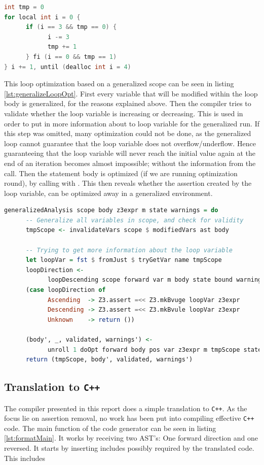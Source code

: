 \begin{lstlisting}[language=C++, label=require-generalize, caption=Loop requirering generalization]
int tmp = 0
for local int i = 0 {
      if (i == 3 && tmp == 0) {
            i -= 3
            tmp += 1
      } fi (i == 0 && tmp == 1)
} i += 1, until (dealloc int i = 4)
\end{lstlisting}
\noindent
This loop optimization based on a generalized scope can be seen in listing
\ref{lst:generalizeLoopOpt}.
First every variable that will be modified within the loop body is generalized, for the
reasons explained above. Then the compiler tries to validate whether the loop variable is
increasing or decreasing. This is used in order to put in more information about to loop
variable for the generalized run. If this step was omitted, many optimization could not be
done, as the generalized loop cannot guarantee that the loop variable does not overflow/underflow.
Hence guaranteeing that the loop variable will never reach the initial value again at the end
of an iteration becomes almost impossible; without the information from the
 call.
Then the statement body is optimized (if we are running optimization round), 
by calling  with . This then reveals whether the assertion
created by the loop variable, can be optimized away in a generalized environment.

\begin{lstlisting}[language=Haskell, label={lst:generalizeLoopOpt},
      caption={Optimizing the loop based on generalized information.}]
generalizedAnalysis scope body z3expr m state warnings = do
      -- Generalize all variables in scope, and check for validity
      tmpScope <- invalidateVars scope $ modifiedVars ast body

      -- Trying to get more information about the loop variable
      let loopVar = fst $ fromJust $ tryGetVar name tmpScope
      loopDirection <-
            loopDescending scope forward var m body state bound warnings
      (case loopDirection of
            Ascending  -> Z3.assert =<< Z3.mkBvuge loopVar z3expr
            Descending -> Z3.assert =<< Z3.mkBvule loopVar z3expr
            Unknown    -> return ())

      (body', _, validated, warnings') <-
            unroll 1 doOpt forward body pos var z3expr m tmpScope state warnings
      return (tmpScope, body', validated, warnings')
\end{lstlisting}

\subsection{Translation to \texttt{C++} \rr}
The \lan compiler presented in this report does a simple translation to \texttt{C++}.
As the focus lie on assertion removal, no work has been put into compiling effective
\texttt{C++} code. The main function of the code generator can be seen in listing
\ref{lst:formatMain}. It works by receiving two AST's: One forward direction and one reversed.
It starts by inserting includes possibly required by the translated code. This includes

